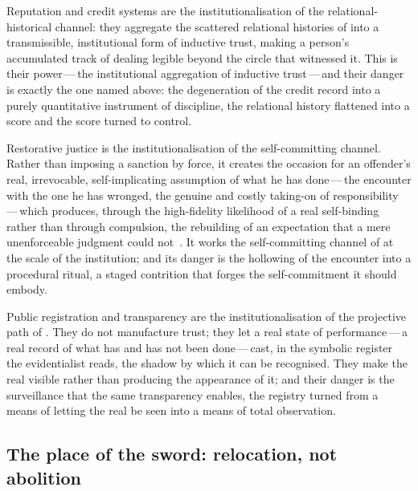 Reputation and credit systems are the institutionalisation of the relational-historical channel: they aggregate the scattered relational histories of  into a transmissible, institutional form of inductive trust, making a person's accumulated track of dealing legible beyond the circle that witnessed it. This is their power\,---\,the institutional aggregation of inductive trust\,---\,and their danger is exactly the one named above: the degeneration of the credit record into a purely quantitative instrument of discipline, the relational history flattened into a score and the score turned to control.

Restorative justice is the institutionalisation of the self-committing channel. Rather than imposing a sanction by force, it creates the occasion for an offender's real, irrevocable, self-implicating assumption of what he has done\,---\,the encounter with the one he has wronged, the genuine and costly taking-on of responsibility\,---\,which produces, through the high-fidelity likelihood of a real self-binding rather than through compulsion, the rebuilding of an expectation that a mere unenforceable judgment could not~\parencite{zehr2002}. It works the self-committing channel of  at the scale of the institution; and its danger is the hollowing of the encounter into a procedural ritual, a staged contrition that forges the self-commitment it should embody.

Public registration and transparency are the institutionalisation of the projective path of . They do not manufacture trust; they let a real state of performance\,---\,a real record of what has and has not been done\,---\,cast, in the symbolic register the evidentialist reads, the shadow by which it can be recognised. They make the real visible rather than producing the appearance of it; and their danger is the surveillance that the same transparency enables, the registry turned from a means of letting the real be seen into a means of total observation.

\subsection{The place of the sword: relocation, not abolition}
\label{p13:sub:jud-sword}

